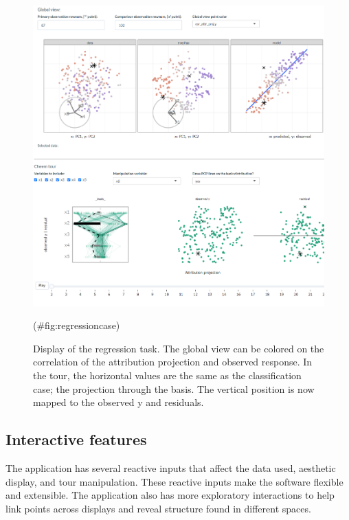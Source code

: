 \documentclass[
]{article}
\begin{document}
\begin{figure}

{\centering \includegraphics[width=1\linewidth]{./figures/app_regression} 

}

\caption{Display of the regression task. The global view can be colored on the correlation of the attribution projection and observed response. In the tour, the horizontal values are the same as the classification case; the projection through the basis. The vertical position is now mapped to the observed y and residuals.}(\#fig:regressioncase)
\end{figure}

\hypertarget{interactive-features}{%
\subsection{Interactive features}\label{interactive-features}}

The application has several reactive inputs that affect the data used,
aesthetic display, and tour manipulation. These reactive inputs make the
software flexible and extensible. The application also has more
exploratory interactions to help link points across displays and reveal
structure found in different spaces.
\end{document}
